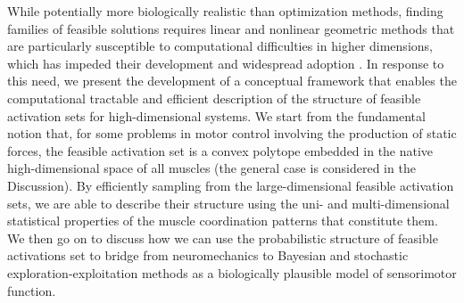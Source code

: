 While potentially more biologically realistic than optimization methods,  finding families of feasible solutions  requires  linear and nonlinear geometric methods that are particularly susceptible to computational difficulties in higher dimensions, which has impeded their development and  widespread adoption \cite{valero2009computational,Chao1978Graphical,spoor1983balancing,Kuo1993Human,theodorou2010optimalityEMBC,scholz1999uncontrolled,dingwell2010walkingvariability}. In response to this need,  we present the development of a conceptual framework that enables the computational tractable and efficient description of the structure of feasible  activation sets  for high-dimensional systems. We start from the fundamental notion that, for some problems in motor control involving the production of static forces, the feasible activation set is a convex polytope embedded in the native high-dimensional space of all muscles (the general case is  considered in the Discussion).  By efficiently sampling from the large-dimensional feasible activation sets, we are  able to describe their structure using the  uni- and multi-dimensional statistical properties of the muscle coordination patterns that constitute them.  We then go on to discuss how  we can use the probabilistic structure of  feasible activations set to bridge  from neuromechanics to  Bayesian and stochastic  exploration-exploitation methods as a biologically plausible model of sensorimotor function.


